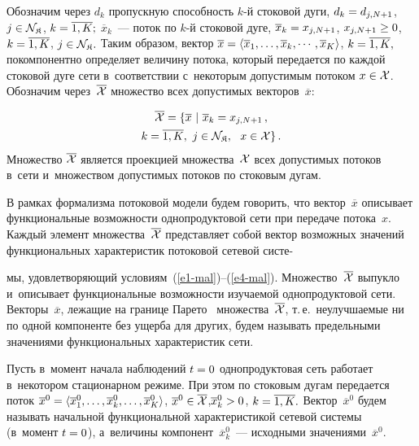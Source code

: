 \begin{multicols}{2}
Обозначим через $d_{k}$ пропускную способность \mbox{$k$-й} стоковой дуги, 
$d_{k}\hm = d _{j, N+1}$, $j \hm\in {\cal N}_\SK$,  $k \hm= \overline{1, K};$
$\overline x_{k}$~--- поток по $k$-й стоковой дуге, 
$\overline x_{k} \hm= x _{j, N+1}$, $x _{j, N+1}\hm\geq 0$, $k \hm= \overline{1, K}$,
$j \hm\in {\cal N}_\SK. $
Таким образом, вектор
$ \overline x \hm= \langle \overline x_{1}, \ldots, \overline x_{k}, \cdots, 
\overline x_{K}\rangle$, 
$k \hm= \overline{1, K},$
покомпонентно определяет величину потока, который передается по каждой 
стоковой дуге сети  в~соответствии с~некоторым допустимым потоком $x \hm\in {\cal X}$.
Обозначим через~$\overline{{\cal X}}$ множество всех допустимых векторов~$\overline x$:

\noindent
\begin{multline}
\overline{{\cal X}} = \{ \overline x \ | \ \overline x_{k} = x _{j, N+1}\,, \\
k = \overline{1, K}, \ j \in {\cal N}_{\frak K}, \ \ x \in {\cal X} \}\,. 
\label{e4-mal}
\end{multline}
Множество $\overline{{\cal X}}$ является проекцией множества~${\cal X}$ всех допустимых потоков в~сети и~множеством 
допустимых потоков по стоковым дугам.

В рамках формализма потоковой модели будем говорить, что 
вектор~$\overline x$ описывает функциональные возможности однопродуктовой сети 
при передаче потока~$x$. Каждый элемент множества~$\overline{{\cal X}}$ пред\-став\-ля\-ет 
собой вектор возможных значений функ\-цио\-наль\-ных характеристик потоковой 
сетевой систе-\linebreak\vspace*{-12pt}

\pagebreak

\noindent
мы, удовлетворяющий условиям~(\ref{e1-mal})--(\ref{e4-mal}).
Множество~$\overline{{\cal X}}$ выпукло и~описывает функциональные возмож\-ности изучаемой 
однопродуктовой сети. Векторы~$\overline x$, лежащие на  границе Парето~\cite{Pod} 
множества~$\overline{{\cal X}}$, т.\,е.\ неулучшаемые ни по одной компоненте без ущерба 
для других, будем называть предельными значениями функциональных характеристик 
сети.

Пусть в~момент начала наблюдений $t \hm= 0$ однопродуктовая сеть работает в~некотором 
ста\-цио\-нар\-ном режиме. При этом по стоковым дугам передается поток
 $\overline x^0 \hm= \langle \overline x_1^0, \ldots, \overline x_k^0,\ldots,  \overline x_K^0\rangle$, 
 $\overline x^0 \hm\in \overline{{\cal X}}$,\linebreak $\overline x_k^0 \hm> 0$, 
 $k \hm= \overline{1, K}.$
Вектор~$\overline x^0$ будем называть начальной функциональной характеристикой сетевой 
сис\-те\-мы (в~момент $t \hm= 0$), а~величины компонент~$\overline x_k^0$~--- 
исходными значениями~$\overline x^0$.


\end{multicols}
